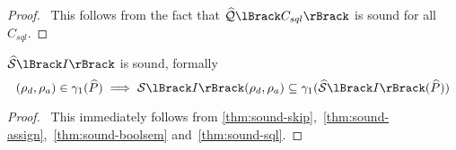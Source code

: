 \begin{proof}
    \pf\
    This follows from the fact that $\abssqlsem{C_{sql}}$ is sound for all $C_{sql}$.
\end{proof}


\begin{conjecture}
    $\abssem{I}$ is sound, formally
    \begin{equation*}
        (\rho_d, \rho_a)
            \in \concrete_1(\ab{P}) \implies \sem{I}(\rho_d, \rho_a) \subseteq \concrete_1(\abssem{I}(\ab{P}))
    \end{equation*}
\end{conjecture}


\begin{proof}
    \pf\
    This immediately follows from \autoref{thm:sound-skip},~\ref{thm:sound-assign},~\ref{thm:sound-boolsem} and~\ref{thm:sound-sql}.
\end{proof}
